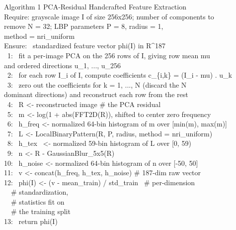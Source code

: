 \documentclass[11pt]{article}
\begin{document}
\begingroup
\ttfamily\small
\setlength{\parindent}{0pt}
\noindent
\begin{tabbing}
Algorithm 1 \quad PCA-Residual Handcrafted Feature Extraction \\[6pt]
Require: grayscale image I of size 256x256; number of components to \\
\qquad\quad remove N = 32; LBP parameters P = 8, radius = 1, \\
\qquad\quad method = nri\_uniform \\
Ensure: \ standardized feature vector phi(I) in R\^{}187 \\[6pt]
\ 1: \ fit a per-image PCA on the 256 rows of I, giving row mean mu \\
\qquad and ordered directions u\_1, ..., u\_256 \\
\ 2: \ for each row I\_i of I, compute coefficients c\_\{i,k\} = (I\_i - mu) . u\_k \\
\ 3: \ zero out the coefficients for k = 1, ..., N (discard the N \\
\qquad dominant directions) and reconstruct each row from the rest \\
\ 4: \ R <- reconstructed image \qquad\qquad\qquad\quad \# the PCA residual \\
\ 5: \ m <- log(1 + abs(FFT2D(R)), shifted to center zero frequency \\
\ 6: \ h\_freq <- normalized 64-bin histogram of m over [min(m), max(m)] \\
\ 7: \ L <- LocalBinaryPattern(R, P, radius, method = nri\_uniform) \\
\ 8: \ h\_tex \ <- normalized 59-bin histogram of L over [0, 59) \\
\ 9: \ n <- R - GaussianBlur\_5x5(R) \\
10: \ h\_noise <- normalized 64-bin histogram of n over [-50, 50] \\
11: \ v <- concat(h\_freq, h\_tex, h\_noise) \qquad\quad \# 187-dim raw vector \\
12: \ phi(I) <- (v - mean\_train) / std\_train \qquad\ \# per-dimension \\
\qquad\qquad\qquad\qquad\qquad\qquad\qquad\qquad\ \ \# standardization, \\
\qquad\qquad\qquad\qquad\qquad\qquad\qquad\qquad\ \ \# statistics fit on \\
\qquad\qquad\qquad\qquad\qquad\qquad\qquad\qquad\ \ \# the training split \\
13: \ return phi(I)
\end{tabbing}
\endgroup
\end{document}
